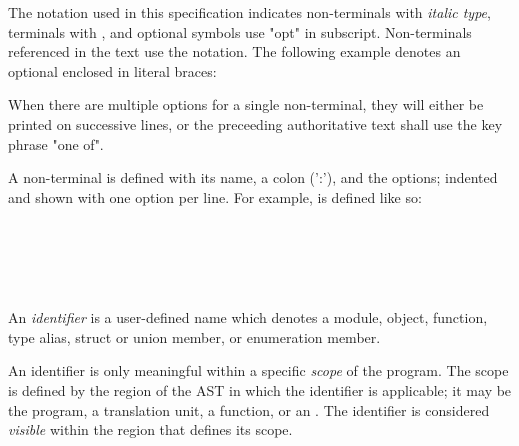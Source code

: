 


\specsubitem
The notation used in this specification indicates non-terminals with
\textit{italic type}, terminals with , and optional
symbols use "opt" in subscript. Non-terminals referenced in the text use the
 notation. The following example denotes an optional
 enclosed in literal braces:

\begin{grammar}
\terminal{\{}  \terminal{\}}
\end{grammar}

\specsubitem
When there are multiple options for a single non-terminal, they will either be
printed on successive lines, or the preceeding authoritative text shall use the
key phrase "one of".

\specsubitem
A non-terminal is defined with its name, a colon (':'), and the options;
indented and shown with one option per line. For example,
 is defined like so:

\begin{grammar}
\\
 \terminal{,}\\
 \terminal{,} 
\end{grammar}

\newpage
{}


\begin{grammar}
\\
 \terminal{::} 
\end{grammar}

\specsubsubitem
An \textit{identifier} is a user-defined name which denotes a module, object,
function, type alias, struct or union member, or enumeration member.

\specsubsubitem
An identifier is only meaningful within a specific \textit{scope} of the
program. The scope is defined by the region of the AST in which the identifier
is applicable; it may be the program, a translation unit, a function, or an
. The identifier is considered \textit{visible}
within the region that defines its scope.

